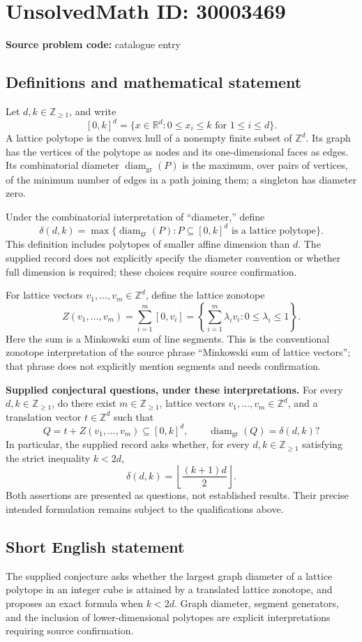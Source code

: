 \documentclass[11pt]{article}
\newcommand{\Z}{\mathbb{Z}}
\newcommand{\R}{\mathbb{R}}
\begin{document}
\section*{UnsolvedMath ID: 30003469}
\textbf{Source problem code:} catalogue entry
\subsection{Definitions and mathematical statement}
Let \(d,k\in\Z_{\geq 1}\), and write
\[
[0,k]^d=\{x\in\R^d:0\leq x_i\leq k\text{ for }1\leq i\leq d\}.
\]
A lattice polytope is the convex hull of a nonempty finite subset of \(\Z^d\). Its graph has the vertices of the polytope as nodes and its one-dimensional faces as edges. Its combinatorial diameter \(\operatorname{diam}_{\mathrm{gr}}(P)\) is the maximum, over pairs of vertices, of the minimum number of edges in a path joining them; a singleton has diameter zero.

Under the combinatorial interpretation of ``diameter,'' define
\[
\delta(d,k)=\max\bigl\{\operatorname{diam}_{\mathrm{gr}}(P):P\subseteq[0,k]^d\text{ is a lattice polytope}\bigr\}.
\]
This definition includes polytopes of smaller affine dimension than \(d\). The supplied record does not explicitly specify the diameter convention or whether full dimension is required; these choices require source confirmation.

For lattice vectors \(v_1,\ldots,v_m\in\Z^d\), define the lattice zonotope
\[
Z(v_1,\ldots,v_m)=\sum_{i=1}^{m}[0,v_i]
=\left\{\sum_{i=1}^{m}\lambda_i v_i:0\leq\lambda_i\leq1\right\}.
\]
Here the sum is a Minkowski sum of line segments. This is the conventional zonotope interpretation of the source phrase ``Minkowski sum of lattice vectors''; that phrase does not explicitly mention segments and needs confirmation.

\textbf{Supplied conjectural questions, under these interpretations.} For every \(d,k\in\Z_{\geq1}\), do there exist \(m\in\Z_{\geq1}\), lattice vectors \(v_1,\ldots,v_m\in\Z^d\), and a translation vector \(t\in\Z^d\) such that
\[
Q=t+Z(v_1,\ldots,v_m)\subseteq[0,k]^d,
\qquad \operatorname{diam}_{\mathrm{gr}}(Q)=\delta(d,k)?
\]
In particular, the supplied record asks whether, for every \(d,k\in\Z_{\geq1}\) satisfying the strict inequality \(k<2d\),
\[
\delta(d,k)=\left\lfloor\frac{(k+1)d}{2}\right\rfloor.
\]
Both assertions are presented as questions, not established results. Their precise intended formulation remains subject to the qualifications above.
\subsection{Short English statement}
The supplied conjecture asks whether the largest graph diameter of a lattice polytope in an integer cube is attained by a translated lattice zonotope, and proposes an exact formula when \(k<2d\). Graph diameter, segment generators, and the inclusion of lower-dimensional polytopes are explicit interpretations requiring source confirmation.
\end{document}
